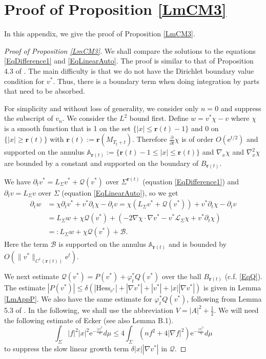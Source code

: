 \documentclass[12pt]{amsart}
\numberwithin{equation}{section}
\numberwithin{equation}{section}
\newcommand{\dt}{\delta}
\begin{document}
	\section{Proof of Proposition \ref{LmCM3}}\label{AppPropCM}
	In this appendix, we give the proof of Proposition \ref{LmCM3}. 
	\begin{proof}[Proof of Proposition \ref{LmCM3}]
		We shall compare the solutions to the equations \eqref{EqDifference1} and \eqref{EqLinearAuto}. 
		The proof is similar to that of Proposition 4.3 of \cite{CM2}. The main difficulty is that we do not have the Dirichlet boundary value condition for $v^*$. Thus, there is a boundary term when doing integration by parts that need to be absorbed. 
		
		For simplicity and without loss of generality, we consider only $n=0$ and suppress the subscript of $v_n$. We consider the $L^2$ bound first. Define $w=v^*\chi -v$
		where $\chi$ is a smooth function that is 1 on the set $\{|x|\leq \mathbf r(t)-1\}$ and $0$ on $\{|x|\geq \mathbf r(t)\}$ with $\mathbf r(t):=\mathbf r(M_{T_\sharp+t})$. Therefore $\frac{\partial}{\partial t}\chi$ is of order $O(\mathrm{e}^{t/2})$ and supported on the annulus $\mathbb A_{\mathbf r(t)}:=\{\mathbf r(t)-1\leq |x|\leq \mathbf r(t)\}$ and $\nabla_x \chi$  and $\nabla_x^2 \chi$ are bounded by a constant and supported on the boundary of $B_{\mathbf r(t)}$. 
		
		We have $\partial_t v^*=L_\Sigma v^*+\mathcal Q(v^*)$ over $\Sigma^{\mathbf r(t)}$ (equation \eqref{EqDifference1}) and $\partial_t v=L_\Sigma v$ over $\Sigma$ (equation \eqref{EqLinearAuto}), so we get
		\begin{equation}\label{Eqdw}
			\begin{aligned}
				\partial_t w&=\chi\partial_t v^*+v^*\partial_t\chi-\partial_tv=\chi(L_\Sigma v^*+\mathcal Q(v^*))+v^*\partial_t\chi-\partial_tv\\
				&=L_\Sigma w+\chi \mathcal Q(v^*)+(-2\nabla\chi\cdot\nabla v^*-v^*\mathcal L_\Sigma \chi+v^*\partial_t\chi)\\
				&=:L_\Sigma w+\chi \mathcal Q(v^*)+\mathcal B.
			\end{aligned}
		\end{equation}
		Here the term $\mathcal B$ is supported on the annulus $\mathbb A_{\mathbf r(t)}$ and is bounded by $O(\|v^*\|_{C^1(\mathbf r(t))}\mathrm{e}^{t})$. 
		
		We next estimate $\mathcal Q( v^*)=P(v^*)+\varphi_t^*Q(v^*)$ over the ball $B_{\mathbf r(t)}$ (c.f. \eqref{EqQ}).  The estimate  $|P(v^*)|\leq \dt(|\mathrm{Hess}_{v^*}|+|\nabla v^*|+|v^*|+|x||\nabla v^*|)$ is given in Lemma \ref{LmAppP}. We also have the same estimate for $ \varphi_t^*Q( v^*)$, following from Lemma 5.3 of \cite{CM3}. In the following, we shall use the abbreviation  $V=|A|^2+\frac12. $ We will need the following estimate of Ecker (see also \cite{BW} Lemma B.1). 
		\begin{equation}\label{EqEcker}\int_\Sigma|f|^2|x|^2\mathrm{e}^{-\frac{|x|^2}{4}}d\mu\leq 4\int_\Sigma (n f^2+4|\nabla f|^2)\mathrm{e}^{-\frac{|x|^2}{4}}d\mu \end{equation}
		to suppress the slow linear growth term $\dt|x||\nabla v^*|$ in $\mathcal Q$. 
		

\end{proof}
\end{document}
